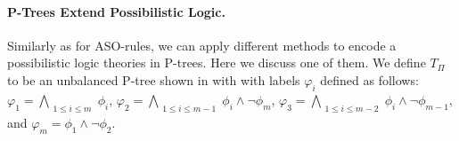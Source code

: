 \paragraph{\bf P-Trees Extend Possibilistic Logic.}


%
%

Similarly as for ASO-rules, we can apply different methods to encode 
a possibilistic logic theories in P-trees. Here we discuss one of them.
We define $T_\Pi$ to be an unbalanced P-tree shown in  with with 
labels $\varphi_i$ defined as follows: 
$\varphi_1=\bigwedge_{\substack{1\leq i \leq m}} \phi_i$, 
$\varphi_2=\bigwedge_{\substack{1\leq i \leq m-1}} \phi_i \wedge \neg \phi_m$,
$\varphi_3=\bigwedge_{\substack{1\leq i \leq m-2}} \phi_i \wedge \neg \phi_{m-1}$, and
$\varphi_m = \phi_1 \wedge \neg \phi_2$.

